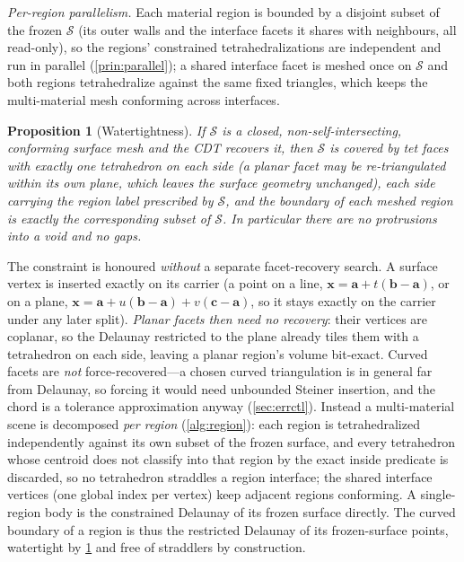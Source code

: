 \documentclass[11pt,a4paper]{article}
\numberwithin{equation}{section}
\newtheorem{proposition}{Proposition}[section]
\newcommand{\vv}[1]{\mathbf{#1}}
\begin{document}
\medskip
\noindent
\emph{Per-region parallelism.} Each material region is bounded by a disjoint
subset of the frozen $\mathcal{S}$ (its outer walls and the interface facets it
shares with neighbours, all read-only), so the regions' constrained
tetrahedralizations are independent and run in parallel
(\cref{prin:parallel}); a shared interface facet is meshed once on $\mathcal{S}$
and both regions tetrahedralize against the same fixed triangles, which keeps
the multi-material mesh conforming across interfaces.

\begin{proposition}[Watertightness]
\label{prop:watertight}
If $\mathcal{S}$ is a closed, non-self-intersecting, conforming surface mesh and
the CDT recovers it, then $\mathcal{S}$ is covered by tet faces with exactly one
tetrahedron on each side (a planar facet may be re-triangulated within its own
plane, which leaves the surface geometry unchanged), each side carrying the
region label prescribed by $\mathcal{S}$, and the boundary of each meshed region
is exactly the corresponding subset of $\mathcal{S}$. In particular there are no
protrusions into a void and no gaps.
\end{proposition}

\noindent
The constraint is honoured \emph{without} a separate facet-recovery search. A
surface vertex is inserted exactly on its carrier (a point on a line, $\vv x=\vv
a+t(\vv b-\vv a)$, or on a plane, $\vv x=\vv a+u(\vv b-\vv a)+v(\vv c-\vv a)$, so
it stays exactly on the carrier under any later split). \emph{Planar facets then
need no recovery}: their vertices are coplanar, so the Delaunay restricted to the
plane already tiles them with a tetrahedron on each side, leaving a planar
region's volume bit-exact. Curved facets are \emph{not} force-recovered---a chosen
curved triangulation is in general far from Delaunay, so forcing it would need
unbounded Steiner insertion, and the chord is a tolerance approximation anyway
(\cref{sec:errctl}). Instead a multi-material scene is decomposed \emph{per
region} (\cref{alg:region}): each region is tetrahedralized independently against
its own subset of the frozen surface, and every tetrahedron whose centroid does
not classify into that region by the exact inside predicate is discarded, so no
tetrahedron straddles a region interface; the shared interface vertices (one
global index per vertex) keep adjacent regions conforming. A single-region body
is the constrained Delaunay of its frozen surface directly. The curved boundary
of a region is thus the restricted Delaunay of its frozen-surface points,
watertight by \cref{prop:watertight} and free of straddlers by construction.
\end{document}
